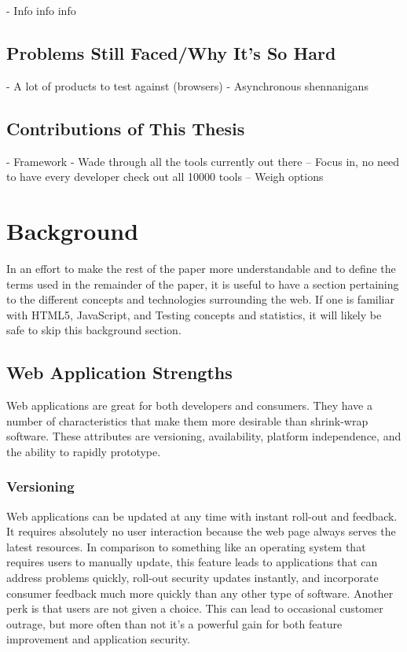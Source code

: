 \documentclass[11pt]{article}
\begin{document}
- Info info info

\subsection{Problems Still Faced/Why It's So Hard}
- A lot of products to test against (browsers)
- Asynchronous shennanigans

\subsection{Contributions of This Thesis}
- Framework
- Wade through all the tools currently out there
-- Focus in, no need to have every developer check out all 10000 tools
-- Weigh options


\section{Background}
In an effort to make the rest of the paper more understandable and to define the terms used in the remainder of the paper, it is useful to have a section pertaining to the different concepts and technologies surrounding the web.
If one is familiar with HTML5, JavaScript, and Testing concepts and statistics, it will likely be safe to skip this background section.

\subsection{Web Application Strengths}
Web applications are great for both developers and consumers. They have a number of characteristics that make them more desirable than shrink-wrap software. These attributes are versioning, availability, platform independence, and the ability to rapidly prototype.

\subsubsection{Versioning}
Web applications can be updated at any time with instant roll-out and feedback. It requires absolutely no user interaction because the web page always serves the latest resources. In comparison to something like an operating system that requires users to manually update, this feature leads to applications that can address problems quickly, roll-out security updates instantly, and incorporate consumer feedback much more quickly than any other type of software. Another perk is that users are not given a choice. This can lead to occasional customer outrage, but more often than not it's a powerful gain for both feature improvement and application security.
\end{document}
